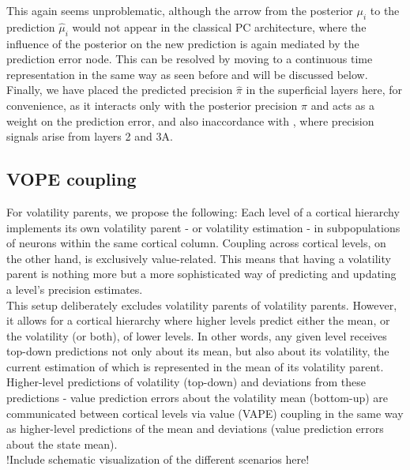 
This again seems unproblematic, although the arrow from the posterior $\mu_i$ to the prediction $\hat{\mu}_i$ would not appear in the classical \textsf{PC} architecture, where the influence of the posterior on the new prediction is again mediated by the prediction error node. This can be resolved by moving to a continuous time representation in the same way as seen before and will be discussed below.\\

Finally, we have placed the predicted precision $\hat{\pi}$ in the superficial layers here, for convenience, as it interacts only with the posterior precision $\pi$ and acts as a weight on the prediction error, and also inaccordance with \cite{Shipp2016}, where precision signals arise from layers 2 and 3A. 

\subsection{VOPE coupling}
For volatility parents, we propose the following: Each level of a cortical hierarchy implements its own volatility parent - or volatility estimation - in subpopulations of neurons within the same cortical column. Coupling across cortical levels, on the other hand, is exclusively value-related. This means that having a volatility parent is nothing more but a more sophisticated way of predicting and updating a level's precision estimates. \\

This setup deliberately excludes volatility parents of volatility parents. However, it allows for a cortical hierarchy where higher levels predict either the mean, or the volatility (or both), of lower levels. In other words, any given level receives top-down predictions not only about its mean, but also about its volatility, the current estimation of which is represented in the mean of its volatility parent. Higher-level predictions of volatility (top-down) and deviations from these predictions - value prediction errors about the volatility mean (bottom-up) are communicated between cortical levels via value (\textsf{VAPE}) coupling in the same way as higher-level predictions of the mean and deviations (value prediction errors about the state mean).\\

!Include schematic visualization of the different scenarios here!\\


